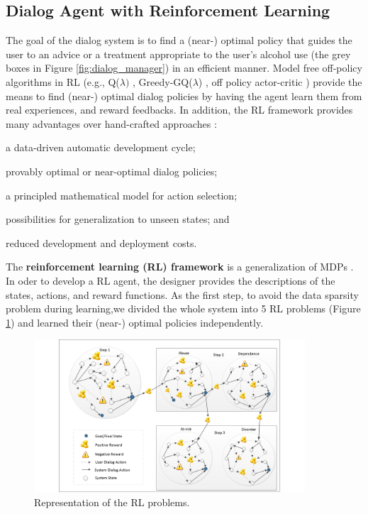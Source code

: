 \documentclass[letterpaper]{article}
\begin{document}
\begin{sloppy}
\subsection{Dialog Agent with Reinforcement Learning}

The goal of the dialog system is to find a (near-) optimal policy that guides the user to an advice 
or a treatment appropriate to the user's alcohol use (the grey boxes in Figure \ref{fig:dialog_manager}) in an efficient manner. 
Model free off-policy algorithms in RL (e.g., Q($\lambda)$ \cite{sutton1998reinforcement}, 
Greedy-GQ($\lambda$) \cite{maei2010toward}, off policy actor-critic \cite{DegrisWS12}) provide the 
means to find (near-) optimal dialog policies by having the agent learn them 
from real experiences, and reward feedbacks. In addition, the RL framework provides many advantages over hand-crafted approaches \cite{lemon2007machine}: \begin{inparaenum}[1)] \item a 
data-driven automatic development cycle; \item provably optimal or near-optimal dialog policies; 
\item  a principled mathematical model for action selection; \item  possibilities for generalization 
to unseen states; and \item reduced development and deployment costs.\end{inparaenum} 

The {\bf reinforcement learning (RL) framework} is a generalization of MDPs \cite{sutton1998reinforcement}. In oder to develop a RL 
agent, the designer provides the descriptions of the states, actions, and reward functions. As the 
first step, to avoid the data sparsity problem during learning,we
divided  the whole system into 5 RL problems (Figure \ref{fig:5mdpv2}) and learned their 
(near-) optimal policies independently. 

\begin{figure}[!t]
  \centering    
	\includegraphics[width=0.9\textwidth]{figures/5MDPV2}
	\caption{Representation of the RL problems.}
  \label{fig:5mdpv2}
\end{figure}


\end{sloppy}
\end{document}
